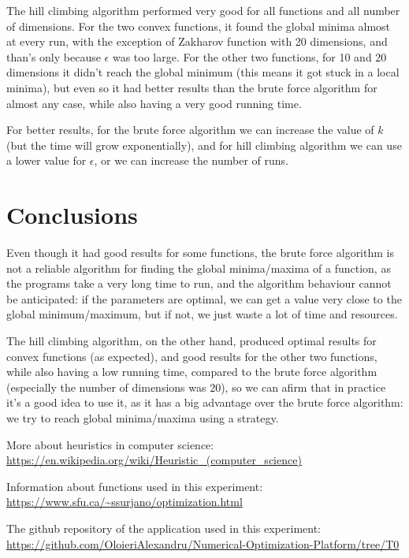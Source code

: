 \documentclass{article}
\begin{document}
The hill climbing algorithm performed very good for all functions and all number of dimensions. For the two convex functions, it found the global minima almost at every run, with the exception of Zakharov function with 20 dimensions, and than's only because $\epsilon$ was too large. For the other two functions, for 10 and 20 dimensions it didn't reach the global minimum (this means it got stuck in a local minima), but even so it had better results than the brute force algorithm for almost any case, while also having a very good running time. 

For better results, for the brute force algorithm we can increase the value of $k$ (but the time will grow exponentially), and for hill climbing algorithm we can use a lower value for $\epsilon$, or we can increase the number of runs.

\section{Conclusions}

Even though it had good results for some functions, the brute force algorithm is not a reliable algorithm for finding the global minima/maxima of a function, as the programs take a very long time to run, and the algorithm behaviour cannot be anticipated: if the parameters are optimal, we can get a value very close to the global minimum/maximum, but if not, we just waste a lot of time and resources.

The hill climbing algorithm, on the other hand, produced optimal results for convex functions (as expected), and good results for the other two functions, while also having a low running time, compared to the brute force algorithm (especially the number of dimensions was 20), so we can afirm that in practice it's a good idea to use it, as it has a big advantage over the brute force algorithm: we try to reach global minima/maxima using a strategy.

\begin{thebibliography}{9}
	
	More about heuristics in computer science:
	\url{https://en.wikipedia.org/wiki/Heuristic_(computer_science)}
	
	Information about functions used in this experiment:
	\url{https://www.sfu.ca/~ssurjano/optimization.html}
	
	The github repository of the application used in this experiment:
	\url{https://github.com/OloieriAlexandru/Numerical-Optimization-Platform/tree/T0}
	
\end{thebibliography}
	
\end{document}
